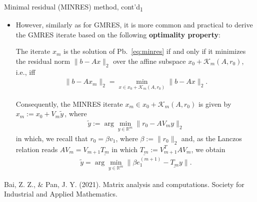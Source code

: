 \documentclass[t,usepdftitle=false]{beamer}
\begin{document}
\begin{frame}{Minimal residual (MINRES) method, cont'd\textsubscript{1}}
\begin{itemize}
\item However, similarly as for GMRES, it is more common and practical to derive the GMRES iterate based on the following \textbf{optimality property}:
\begin{theorem}
The iterate $x_m$ is the solution of Pb.~\eqref{eq:minres} if and only if it minimizes the residual norm $\|b-Ax\|_2$ over the affine subspace $x_0+\mathcal{K}_m(A,r_0)$, i.e., iff\vspace{-.2cm}
\begin{align*}
\|b-Ax_m\|_2=
\min_{x\in x_0+\mathcal{K}_m(A,r_0)}\|b-Ax\|_2.
\end{align*}
\end{theorem}
Consequently, the MINRES iterate $x_m\in x_0+\mathcal{K}_m(A,r_0)$ is given by $\boxed{x_m:=x_0+V_m\tilde{y}}\,$, where
\begin{align*}
\tilde{y}:=\arg\min_{y\in\mathbb{R}^m}\|r_0-AV_my\|_2
\end{align*}
in which, we recall that $r_0=\beta v_1$, where $\beta:=\|r_0\|_2$ and, as the Lanczos relation reads $AV_m=V_{m+1}\underline{T_m}$ in which $\underline{T_m}:=V_{m+1}^TAV_m$, we obtain
\begin{align*}
\tilde{y}=\arg\min_{y\in\mathbb{R}^m}\|\beta e_1^{(m+1)}-\underline{T_m}y\|.
\end{align*}
\end{itemize}
\smallskip
\tiny{Bai, Z. Z., \& Pan, J. Y. (2021). Matrix analysis and computations. Society for Industrial and Applied Mathematics.}
\end{frame}
\end{document}
